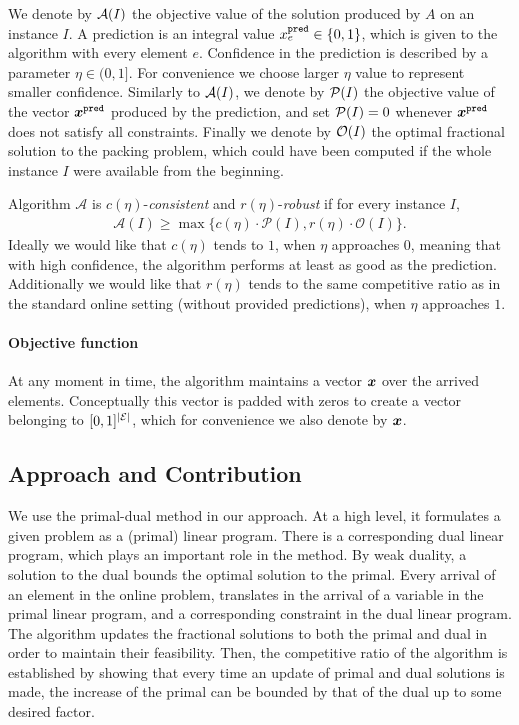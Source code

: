 We denote by ${\cal A}(I)$ the objective value of the solution produced by $A$ on an instance $I$.  A prediction is an integral value $x^{\texttt{pred}}_{e}\in\{0,1\}$, which is given to the algorithm with every element $e$.  Confidence in the prediction is described by a parameter $\eta \in (0,1]$. For  convenience we choose larger $\eta$ value to represent smaller confidence.  Similarly to ${\cal A}(I)$, we denote by ${\cal P}(I)$ the objective value of the vector $\bm{x}^{\texttt{pred}}$ produced by the prediction, and set ${\cal P}(I)=0$ whenever $\bm{x}^{\texttt{pred}}$ does not satisfy all constraints. Finally we denote by ${\cal O}(I)$ the optimal fractional solution to the packing problem, which could have been computed if the whole instance $I$ were available from the beginning.


Algorithm $\mathcal{A}$ is 
 $c(\eta)$-\emph{consistent} and  $r(\eta)$-\emph{robust} if for every instance $I$, 
 \begin{align*}
 	\mathcal{A}(I) 	\geq 	\max\{c(\eta) \cdot \mathcal{P}(I), r(\eta) \cdot \mathcal{O}(I) \}.
 \end{align*}
Ideally we would like that $c(\eta)$ tends to $1$, when $\eta$ approaches $0$, meaning that with high confidence, the algorithm performs at least as good as the prediction. Additionally we would like that $r(\eta)$ tends to the same competitive ratio as in the standard online setting (without provided predictions), when $\eta$ approaches $1$.
  
\paragraph{Objective function}
At any moment in time, the algorithm maintains a vector $\bm{x}$ over the arrived elements. Conceptually this vector is padded with zeros to create a vector belonging to $[0,1]^{|\cal E|}$, which for  convenience we also denote by $\bm{x}$.  %
  
\subsection{Approach and Contribution}  
  
We use the primal-dual method in our approach.  
At a high level, it formulates a given problem as a (primal) linear program.  There is a corresponding dual linear program, which plays an important role in the method.  By weak duality, a solution to the dual bounds the optimal solution to the primal.  Every arrival of an element in the online problem, translates in the arrival of a variable in the primal linear program, and a corresponding constraint in the dual linear program. The algorithm updates the fractional solutions to both the primal and 
dual in order to maintain their feasibility. Then, the competitive ratio of the algorithm is established 
by showing that every time an update of primal and dual solutions is made, the increase of the primal 
can be bounded by that of the dual up to some desired factor.   
 
